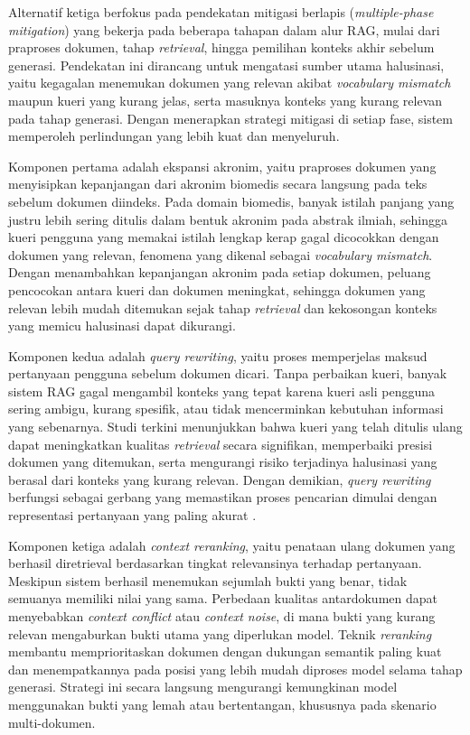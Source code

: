 Alternatif ketiga berfokus pada pendekatan mitigasi berlapis (\textit{multiple-phase mitigation}) yang bekerja pada beberapa tahapan dalam alur RAG, mulai dari praproses dokumen, tahap \textit{retrieval}, hingga pemilihan konteks akhir sebelum generasi. Pendekatan ini dirancang untuk mengatasi sumber utama halusinasi, yaitu kegagalan menemukan dokumen yang relevan akibat \textit{vocabulary mismatch} maupun kueri yang kurang jelas, serta masuknya konteks yang kurang relevan pada tahap generasi. Dengan menerapkan strategi mitigasi di setiap fase, sistem memperoleh perlindungan yang lebih kuat dan menyeluruh.

Komponen pertama adalah ekspansi akronim, yaitu praproses dokumen yang menyisipkan kepanjangan dari akronim biomedis secara langsung pada teks sebelum dokumen diindeks. Pada domain biomedis, banyak istilah panjang yang justru lebih sering ditulis dalam bentuk akronim pada abstrak ilmiah, sehingga kueri pengguna yang memakai istilah lengkap kerap gagal dicocokkan dengan dokumen yang relevan, fenomena yang dikenal sebagai \textit{vocabulary mismatch}. Dengan menambahkan kepanjangan akronim pada setiap dokumen, peluang pencocokan antara kueri dan dokumen meningkat, sehingga dokumen yang relevan lebih mudah ditemukan sejak tahap \textit{retrieval} dan kekosongan konteks yang memicu halusinasi dapat dikurangi.

Komponen kedua adalah \textit{query rewriting}, yaitu proses memperjelas maksud pertanyaan pengguna sebelum dokumen dicari. Tanpa perbaikan kueri, banyak sistem RAG gagal mengambil konteks yang tepat karena kueri asli pengguna sering ambigu, kurang spesifik, atau tidak mencerminkan kebutuhan informasi yang sebenarnya. Studi terkini menunjukkan bahwa kueri yang telah ditulis ulang dapat meningkatkan kualitas \textit{retrieval} secara signifikan, memperbaiki presisi dokumen yang ditemukan, serta mengurangi risiko terjadinya halusinasi yang berasal dari konteks yang kurang relevan. Dengan demikian, \textit{query rewriting} berfungsi sebagai gerbang yang memastikan proses pencarian dimulai dengan representasi pertanyaan yang paling akurat \parencite{wang2024maferw}.

Komponen ketiga adalah \textit{context reranking}, yaitu penataan ulang dokumen yang berhasil diretrieval berdasarkan tingkat relevansinya terhadap pertanyaan. Meskipun sistem berhasil menemukan sejumlah bukti yang benar, tidak semuanya memiliki nilai yang sama. Perbedaan kualitas antardokumen dapat menyebabkan \textit{context conflict} atau \textit{context noise}, di mana bukti yang kurang relevan mengaburkan bukti utama yang diperlukan model. Teknik \textit{reranking} membantu memprioritaskan dokumen dengan dukungan semantik paling kuat dan menempatkannya pada posisi yang lebih mudah diproses model selama tahap generasi. Strategi ini secara langsung mengurangi kemungkinan model menggunakan bukti yang lemah atau bertentangan, khususnya pada skenario multi-dokumen.

